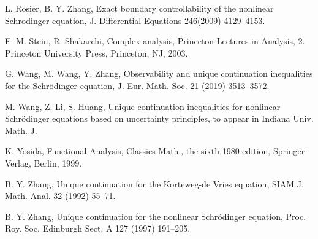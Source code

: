 \documentclass[12pt]{amsart}
\theoremstyle{definition}
\numberwithin{equation}{section}
\begin{document}
\begin{thebibliography}{999}
{ L. Rosier, B. Y. Zhang,  Exact boundary controllability of the nonlinear Schrodinger equation, J. Differential Equations 246(2009) 4129--4153.

 E. M. Stein, R. Shakarchi, Complex analysis, Princeton Lectures in Analysis, 2. Princeton University Press, Princeton, NJ, 2003.

   G. Wang, M. Wang, Y. Zhang, Observability and unique continuation inequalities for the Schr\"{o}dinger equation, J. Eur. Math. Soc.  21 (2019) 3513--3572.


 M. Wang, Z. Li, S. Huang, Unique continuation inequalities for nonlinear Schr\"{o}dinger equations based on uncertainty principles, to appear in Indiana Univ. Math. J.

 K. Yosida, Functional Analysis, Classics Math., the sixth 1980 edition, Springer-Verlag, Berlin, 1999.


 B. Y. Zhang,   Unique continuation for the Korteweg-de Vries equation, SIAM J. Math. Anal. 32 (1992)  55--71.

 B. Y. Zhang,   Unique continuation for the nonlinear Schr\"odinger equation, Proc. Roy. Soc. Edinburgh Sect. A 127 (1997)  191--205.
     }
\end{thebibliography}
\end{document}
